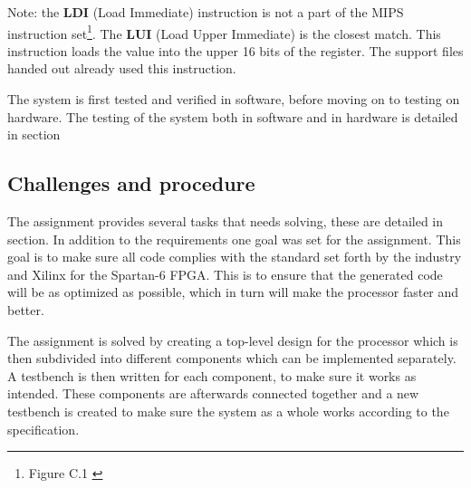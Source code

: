 Note: the {\bf LDI} (Load Immediate) instruction is not a part of the MIPS instruction set\footnote{Figure C.1 \cite[p.66]{compendium}}.
The {\bf LUI} (Load Upper Immediate) is the closest match.
This instruction loads the value into the upper 16 bits of the register.
The support files handed out already used this instruction.

The system is first tested and verified in software, before moving on to testing on hardware.
The testing of the system both in software and in hardware is detailed in section%

\subsection{Challenges and procedure}

The assignment provides several tasks that needs solving, these are detailed in section.%
In addition to the requirements one goal was set for the assignment.
This goal is to make sure all code complies with the standard set forth by the industry
and Xilinx for the Spartan-6 FPGA.
This is to ensure that the generated code will be as optimized as possible,
which in turn will make the processor faster and better.

The assignment is solved by creating a top-level design for the processor which is then subdivided into different components which can be implemented separately.
A testbench is then written for each component, to make sure it works as intended.
These components are afterwards connected together and a new testbench is created to
make sure the system as a whole works according to the specification.
